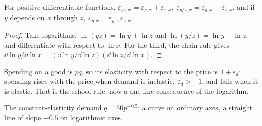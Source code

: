 \begin{proposition}\label{prop:b1:comparative-statics:rules}
For positive differentiable functions,
$\varepsilon_{yz, x} = \varepsilon_{y,x} + \varepsilon_{z,x}$,
$\varepsilon_{y/z, x} = \varepsilon_{y,x} - \varepsilon_{z,x}$, and if $y$
depends on $x$ through $z$, $\varepsilon_{y,x} = \varepsilon_{y,z}\,\varepsilon_{z,x}$.
\end{proposition}

\begin{proof}
Take logarithms: $\ln(yz) = \ln y + \ln z$ and $\ln(y/z) = \ln y - \ln z$, and
differentiate with respect to $\ln x$. For the third, the chain rule gives
$\dd\ln y/\dd\ln x = (\dd\ln y/\dd\ln z)(\dd\ln z/\dd\ln x)$.
\end{proof}

Spending on a good is $pq$, so its elasticity with respect to the price is
$1 + \varepsilon_d$: spending rises with the price when demand is inelastic,
$\varepsilon_d > -1$, and falls when it is elastic. That is the school rule,
now a one-line consequence of the logarithm.

\begin{omfigure}

{\small The constant-elasticity demand $q = 50p^{-0.5}$: a curve on ordinary
axes, a straight line of slope $-0.5$ on logarithmic axes.}
\end{omfigure}

